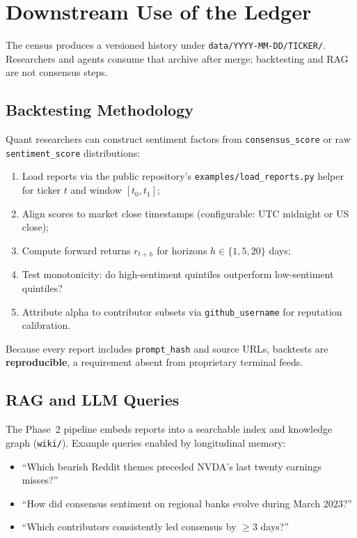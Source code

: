 \documentclass[10pt,twocolumn]{article}
\begin{document}
\section{Downstream Use of the Ledger}
\label{sec:downstream}

The census produces a versioned history under \texttt{data/YYYY-MM-DD/TICKER/}. Researchers and agents consume that archive after merge; backtesting and RAG are not consensus steps.

\subsection{Backtesting Methodology}

Quant researchers can construct sentiment factors from \texttt{consensus\_score} or raw \texttt{sentiment\_score} distributions:

\begin{enumerate}[label=(\alph*)]
  \item Load reports via the public repository's \texttt{examples/load\_reports.py} helper for ticker $t$ and window $[t_0, t_1]$;
  \item Align scores to market close timestamps (configurable: UTC midnight or US close);
  \item Compute forward returns $r_{t+h}$ for horizons $h \in \{1, 5, 20\}$ days;
  \item Test monotonicity: do high-sentiment quintiles outperform low-sentiment quintiles?
  \item Attribute alpha to contributor subsets via \texttt{github\_username} for reputation calibration.
\end{enumerate}

Because every report includes \texttt{prompt\_hash} and source URLs, backtests are \textbf{reproducible}, a requirement absent from proprietary terminal feeds.

\subsection{RAG and LLM Queries}

The Phase~2 pipeline embeds reports into a searchable index and knowledge graph (\texttt{wiki/}). Example queries enabled by longitudinal memory:

\begin{itemize}
  \item ``Which bearish Reddit themes preceded NVDA's last twenty earnings misses?''
  \item ``How did consensus sentiment on regional banks evolve during March 2023?''
  \item ``Which contributors consistently led consensus by $\geq 3$ days?''
\end{itemize}
\end{document}
